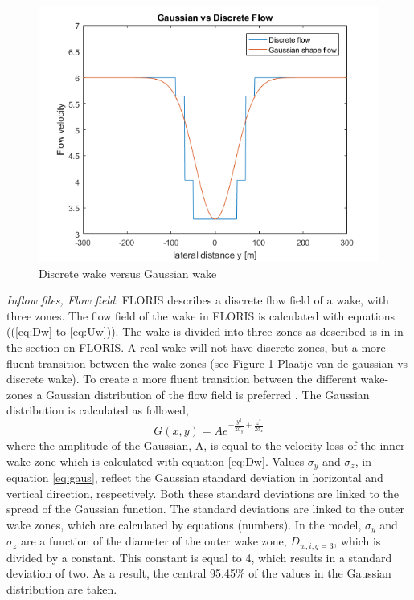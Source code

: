 \begin{figure}
  \includegraphics[width=\linewidth]{./Figures/PlotGausDiscWakeDWake180U6yaw0.png} %
  \caption{Discrete wake versus Gaussian wake} %
  \label{fig:disgaus}
\end{figure}

\textit{Inflow files, Flow field}: FLORIS describes a discrete flow field of a wake, with three zones. The flow field of the wake in FLORIS is calculated with equations ((\ref{eq:Dw} to \ref{eq:Uw})). The wake is divided into three zones as described is in in the section on FLORIS. A real wake will not have discrete zones, but a more fluent transition between the wake zones (see Figure \ref{fig:disgaus} Plaatje van de gaussian vs discrete wake). To create a more fluent transition between the different wake-zones a Gaussian distribution of the flow field is preferred \cite{Bastankhah2016}. The Gaussian distribution is calculated as followed, 
\begin{equation}
\label{eq:gaus}
G(x, y) = A e^{-\frac{y^2}{2\sigma_y} + \frac{z^2}{2\sigma_z}}
\end{equation}
where the amplitude of the Gaussian, A, is equal to the velocity loss of the inner wake zone which is calculated with equation \ref{eq:Dw}. Values $\sigma_y$ and $\sigma_z$, in equation \ref{eq:gaus}, reflect the Gaussian standard deviation in horizontal and vertical direction, respectively. Both these standard deviations are linked to the spread of the Gaussian function. The standard deviations are linked to the outer wake zones, which are calculated by equations (numbers). In the model, $\sigma_y$ and $\sigma_z$ are a function of the diameter of the outer wake zone,  $D_{w,i,q=3}$, which is divided by a constant. This constant is equal to 4, which results in a standard deviation of two. As a result, the central 95.45\% of the values in the Gaussian distribution are taken. 

